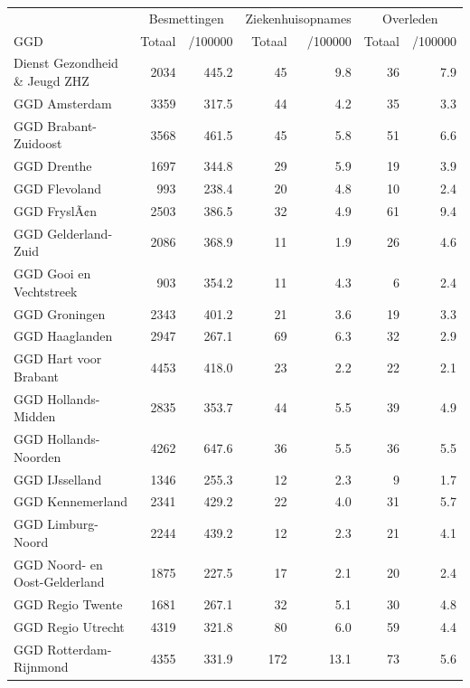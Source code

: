 \documentclass[
  english,
  man,floatsintext]{apa6}
\begin{document}
\begin{table}
\centering\begingroup\fontsize{10}{12}\selectfont

\begin{threeparttable}
\begin{tabular}{lrrrrrr}
\toprule
\multicolumn{1}{c}{ } & \multicolumn{2}{c}{Besmettingen} & \multicolumn{2}{c}{Ziekenhuisopnames} & \multicolumn{2}{c}{Overleden} \\
\cmidrule(l{3pt}r{3pt}){2-3} \cmidrule(l{3pt}r{3pt}){4-5} \cmidrule(l{3pt}r{3pt}){6-7}
GGD & Totaal & /100000 & Totaal & /100000 & Totaal & /100000\\
\midrule
Dienst Gezondheid \& Jeugd ZHZ & 2034 & 445.2 & 45 & 9.8 & 36 & 7.9\\
GGD Amsterdam & 3359 & 317.5 & 44 & 4.2 & 35 & 3.3\\
GGD Brabant-Zuidoost & 3568 & 461.5 & 45 & 5.8 & 51 & 6.6\\
GGD Drenthe & 1697 & 344.8 & 29 & 5.9 & 19 & 3.9\\
GGD Flevoland & 993 & 238.4 & 20 & 4.8 & 10 & 2.4\\
GGD FryslÃ¢n & 2503 & 386.5 & 32 & 4.9 & 61 & 9.4\\
GGD Gelderland-Zuid & 2086 & 368.9 & 11 & 1.9 & 26 & 4.6\\
GGD Gooi en Vechtstreek & 903 & 354.2 & 11 & 4.3 & 6 & 2.4\\
GGD Groningen & 2343 & 401.2 & 21 & 3.6 & 19 & 3.3\\
GGD Haaglanden & 2947 & 267.1 & 69 & 6.3 & 32 & 2.9\\
GGD Hart voor Brabant & 4453 & 418.0 & 23 & 2.2 & 22 & 2.1\\
GGD Hollands-Midden & 2835 & 353.7 & 44 & 5.5 & 39 & 4.9\\
GGD Hollands-Noorden & 4262 & 647.6 & 36 & 5.5 & 36 & 5.5\\
GGD IJsselland & 1346 & 255.3 & 12 & 2.3 & 9 & 1.7\\
GGD Kennemerland & 2341 & 429.2 & 22 & 4.0 & 31 & 5.7\\
GGD Limburg-Noord & 2244 & 439.2 & 12 & 2.3 & 21 & 4.1\\
GGD Noord- en Oost-Gelderland & 1875 & 227.5 & 17 & 2.1 & 20 & 2.4\\
GGD Regio Twente & 1681 & 267.1 & 32 & 5.1 & 30 & 4.8\\
GGD Regio Utrecht & 4319 & 321.8 & 80 & 6.0 & 59 & 4.4\\
GGD Rotterdam-Rijnmond & 4355 & 331.9 & 172 & 13.1 & 73 & 5.6\\

\end{tabular}
\end{threeparttable}
\end{table}
\end{document}
